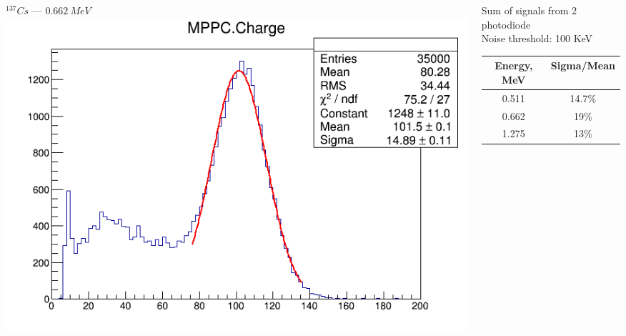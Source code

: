 \documentclass[11pt]{beamer}
\begin{document}
\begin{frame}
    \begin{columns}
    \begin{column}{0.5\textwidth}
        $^{137}Cs$ --- $0.662~MeV$\\
        \includegraphics[width=1\textwidth]{figures/setup2.png}
    \end{column}
    \begin{column}{0.5\textwidth}
                Sum of signals from 2 photodiode\\
                Noise threshold: 100 KeV\\
        \begin{tabular}[c]{|c|c|}
             \hline 
            Energy, MeV & Sigma/Mean \\
            \hline 
           0.511 & 14.7\%  \\ 
            \hline 
            0.662 & 19\%\\ 
            \hline 
            1.275 & 13\%\\
            \hline 
        \end{tabular} 
\\

    \end{column}
\end{columns} 
     
\end{frame}
\end{document}
